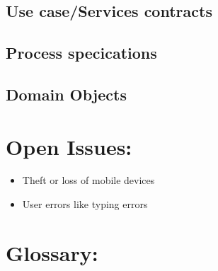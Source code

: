 \documentclass[12pt]{article}
\begin{document}
		\vspace{0.2in}
		
		\subsection{Use case/Services contracts}
		\vspace{0.2in}
		
		\vspace{0.2in}
		
		\subsection{Process specications}
		\vspace{0.2in}
		
		\vspace{0.2in}
		
		\subsection{Domain Objects}
		\vspace{0.2in}
		
		\vspace{0.5in}
		
	\newpage	
	\section{Open Issues:}
	\vspace{0.2in}
	
	\begin{itemize}
		\item Theft or loss of mobile devices
		\item User errors like typing errors
	\end{itemize}
	
	
	\vspace{0.5in}
	
	\newpage
	\section{Glossary:}
	\vspace{0.2in}
		
	
	\vspace{0.5in}
		
\end{document}
